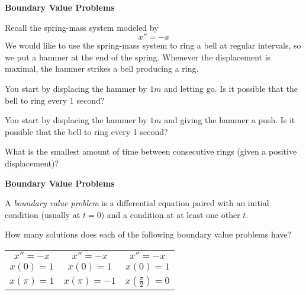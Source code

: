 \documentclass{workbook}
\begin{document}
\begin{slide}
	\textbf{Boundary Value Problems}

	\question
	Recall the spring-mass system modeled by
	\[
		x''=-x
	\]
	We would like to use the spring-mass system to ring a bell at regular intervals, 
	so we put a hammer at the end of the spring. Whenever the displacement is maximal,
	the hammer strikes a bell producing a ring.

	\begin{parts}
		\item You start by displacing the hammer by $1m$ and letting go. Is it possible that the bell to ring every 1 second?
		\item You start by displacing the hammer by $1m$ and giving the hammer a push. Is it possible that the bell to ring every 1 second?
		\item What is the smallest amount of time between consecutive rings (given a positive displacement)?
	\end{parts}
\end{slide}

\begin{slide}
	\textbf{Boundary Value Problems}

	\question
		A \emph{boundary value problem} is a differential equation paired with an initial condition (usually at $t=0$) and 
		a condition at at least one other $t$.

	\begin{parts}
		\item How many solutions does each of the following boundary value problems have?

		\begin{center}
			\begin{tabular}{ccc}
				$x''=-x$ &
				$x''=-x$ &
				$x''=-x$ \\
				$x(0)=1$ &
				$x(0)=1$ &
				$x(0)=1$ \\ 
				$x(\pi)=1$ & 
				$x(\pi)=-1$ & 
				$x(\frac{\pi}{2})=0$
			\end{tabular}
		\end{center}
	\end{parts}
\end{slide}
\end{document}
